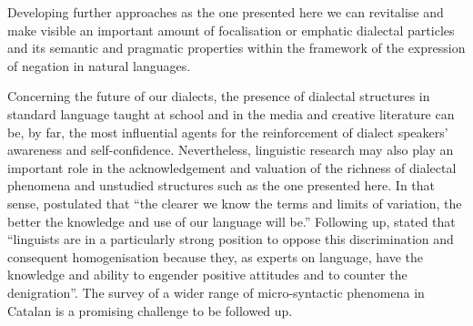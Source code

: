 \documentclass[output=paper]{LSP/langsci}
\begin{document}
Developing further approaches as the one presented here we can revitalise and make visible an important amount of focalisation or emphatic dialectal particles and its semantic and pragmatic properties within the framework of the expression of negation in natural languages.

Concerning the future of our dialects, the presence of dialectal structures in standard language taught at school and in the media and creative literature can be, by far, the most influential agents for the reinforcement of dialect speakers’ awareness and self-confidence. Nevertheless, linguistic research may also play an important role in the acknowledgement and valuation of the richness of dialectal phenomena and unstudied structures such as the one presented here. In that sense, \citet[80]{rigau_variacio_1998} postulated that “the clearer we know the terms and limits of variation, the better the knowledge and use of our language will be.”  Following up, \citet[31]{trudgill_sociolinguistic_2002} stated that “linguists are in a particularly strong position to oppose this discrimination and consequent homogenisation because they, as experts on language, have the knowledge and ability to engender positive attitudes and to counter the denigration”. The survey of a wider range of micro-syntactic phenomena in Catalan is a promising challenge to be followed up.

\printbibliography[heading=subbibliography,notkeyword=this]
\end{document}

